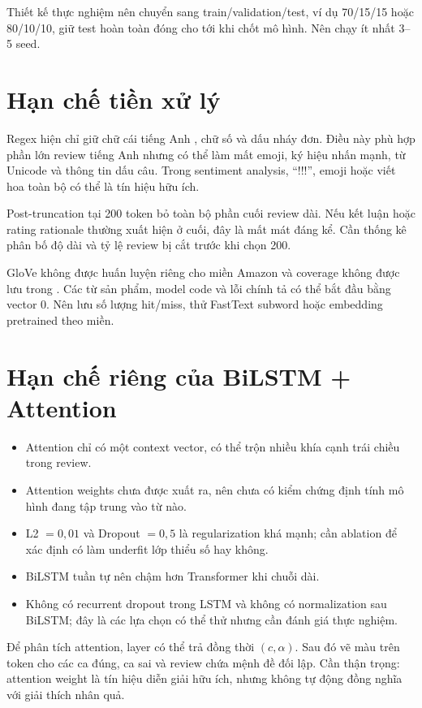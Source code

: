 \documentclass[12pt]{report}
\newcommand{\codeword}[1]{\texttt{\detokenize{#1}}}
\begin{document}
Thiết kế thực nghiệm nên chuyển sang train/validation/test, ví dụ 70/15/15 hoặc
80/10/10, giữ test hoàn toàn đóng cho tới khi chốt mô hình. Nên chạy ít nhất
3--5 seed.

\section{Hạn chế tiền xử lý}

Regex hiện chỉ giữ chữ cái tiếng Anh \codeword{a-z}, chữ số và dấu nháy đơn.
Điều này phù hợp phần lớn review tiếng Anh nhưng có thể làm mất emoji, ký hiệu
nhấn mạnh, từ Unicode và thông tin dấu câu. Trong sentiment analysis, ``!!!'',
emoji hoặc viết hoa toàn bộ có thể là tín hiệu hữu ích.

Post-truncation tại 200 token bỏ toàn bộ phần cuối review dài. Nếu kết luận hoặc
rating rationale thường xuất hiện ở cuối, đây là mất mát đáng kể. Cần thống kê
phân bố độ dài và tỷ lệ review bị cắt trước khi chọn 200.

GloVe không được huấn luyện riêng cho miền Amazon và coverage không được lưu
trong \codeword{metrics.json}. Các từ sản phẩm, model code và lỗi chính tả có
thể bắt đầu bằng vector 0. Nên lưu số lượng hit/miss, thử FastText subword hoặc
embedding pretrained theo miền.

\section{Hạn chế riêng của BiLSTM + Attention}

\begin{itemize}
    \item Attention chỉ có một context vector, có thể trộn nhiều khía cạnh trái
    chiều trong review.
    \item Attention weights chưa được xuất ra, nên chưa có kiểm chứng định tính
    mô hình đang tập trung vào từ nào.
    \item L2 $=0,01$ và Dropout $=0,5$ là regularization khá mạnh; cần ablation
    để xác định có làm underfit lớp thiểu số hay không.
    \item BiLSTM tuần tự nên chậm hơn Transformer khi chuỗi dài.
    \item Không có recurrent dropout trong LSTM và không có normalization sau
    BiLSTM; đây là các lựa chọn có thể thử nhưng cần đánh giá thực nghiệm.
\end{itemize}

Để phân tích attention, layer có thể trả đồng thời $(c,\alpha)$. Sau đó vẽ màu
trên token cho các ca đúng, ca sai và review chứa mệnh đề đối lập. Cần thận
trọng: attention weight là tín hiệu diễn giải hữu ích, nhưng không tự động đồng
nghĩa với giải thích nhân quả.
\end{document}
